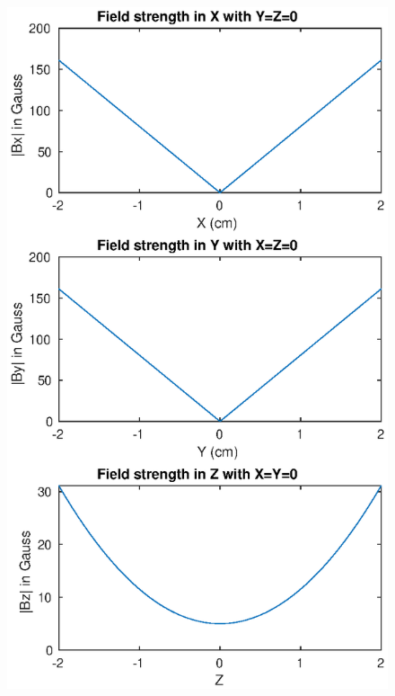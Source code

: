 \documentclass{article}
\theoremstyle{definition}
\begin{document}
\begin{figure}[!htb]
	\centering
	
	\begin{minipage}{.49\textwidth}
		\centering
		\includegraphics[width=\linewidth]{sim-figs/IP-1.eps}
	\end{minipage}%
	\begin{minipage}{.49\textwidth}
		\centering

\end{minipage}
\end{figure}
\end{document}
